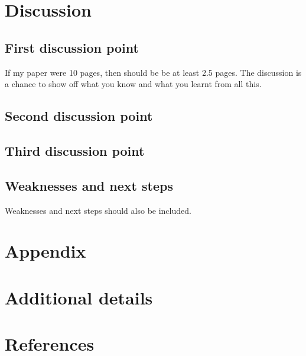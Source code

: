 \documentclass[
]{article}
\begin{document}
\hypertarget{discussion}{%
\section{Discussion}\label{discussion}}

\hypertarget{first-discussion-point}{%
\subsection{First discussion point}\label{first-discussion-point}}

If my paper were 10 pages, then should be be at least 2.5 pages. The discussion is a chance to show off what you know and what you learnt from all this.

\hypertarget{second-discussion-point}{%
\subsection{Second discussion point}\label{second-discussion-point}}

\hypertarget{third-discussion-point}{%
\subsection{Third discussion point}\label{third-discussion-point}}

\hypertarget{weaknesses-and-next-steps}{%
\subsection{Weaknesses and next steps}\label{weaknesses-and-next-steps}}

Weaknesses and next steps should also be included.

\newpage

\appendix

\hypertarget{appendix}{%
\section*{Appendix}\label{appendix}}

\hypertarget{additional-details}{%
\section{Additional details}\label{additional-details}}

\newpage

\hypertarget{references}{%
\section*{References}\label{references}}
\end{document}
